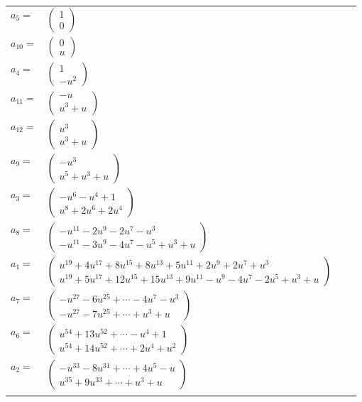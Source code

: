 \documentclass[1p]{elsarticle_modified}
\theoremstyle{definition}
\begin{document}
\begin{tabular}{m{7pt} m{180pt} m{7pt} m{180pt} }
\flushright $a_{5}=$&$\begin{pmatrix}1\\0\end{pmatrix}$ \\
\flushright $a_{10}=$&$\begin{pmatrix}0\\u\end{pmatrix}$ \\
\flushright $a_{4}=$&$\begin{pmatrix}1\\- u^2\end{pmatrix}$ \\
\flushright $a_{11}=$&$\begin{pmatrix}- u\\u^3+u\end{pmatrix}$ \\
\flushright $a_{12}=$&$\begin{pmatrix}u^3\\u^3+u\end{pmatrix}$ \\
\flushright $a_{9}=$&$\begin{pmatrix}- u^3\\u^5+u^3+u\end{pmatrix}$ \\
\flushright $a_{3}=$&$\begin{pmatrix}- u^6- u^4+1\\u^8+2 u^6+2 u^4\end{pmatrix}$ \\
\flushright $a_{8}=$&$\begin{pmatrix}- u^{11}-2 u^9-2 u^7- u^3\\- u^{11}-3 u^9-4 u^7- u^5+u^3+u\end{pmatrix}$ \\
\flushright $a_{1}=$&$\begin{pmatrix}u^{19}+4 u^{17}+8 u^{15}+8 u^{13}+5 u^{11}+2 u^9+2 u^7+u^3\\u^{19}+5 u^{17}+12 u^{15}+15 u^{13}+9 u^{11}- u^9-4 u^7-2 u^5+u^3+u\end{pmatrix}$ \\
\flushright $a_{7}=$&$\begin{pmatrix}- u^{27}-6 u^{25}+\cdots-4 u^7- u^3\\- u^{27}-7 u^{25}+\cdots+u^3+u\end{pmatrix}$ \\
\flushright $a_{6}=$&$\begin{pmatrix}u^{54}+13 u^{52}+\cdots- u^4+1\\u^{54}+14 u^{52}+\cdots+2 u^4+u^2\end{pmatrix}$ \\
\flushright $a_{2}=$&$\begin{pmatrix}- u^{33}-8 u^{31}+\cdots+4 u^5- u\\u^{35}+9 u^{33}+\cdots+u^3+u\end{pmatrix}$\\&\end{tabular}
\end{document}
